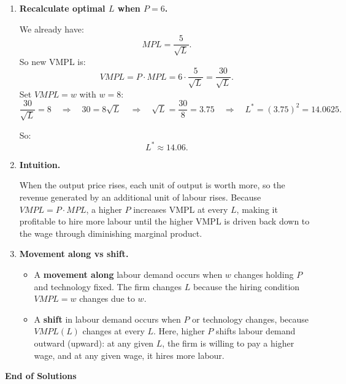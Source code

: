 \documentclass[12pt]{article}
\begin{document}
\begin{enumerate}
\item \textbf{Recalculate optimal $L$ when $P=6$.}

We already have:
\[
MPL = \frac{5}{\sqrt{L}}.
\]
So new VMPL is:
\[
VMPL = P \cdot MPL = 6 \cdot \frac{5}{\sqrt{L}} = \frac{30}{\sqrt{L}}.
\]
Set $VMPL=w$ with $w=8$:
\[
\frac{30}{\sqrt{L}} = 8
\quad \Rightarrow \quad
30 = 8\sqrt{L}
\quad \Rightarrow \quad
\sqrt{L} = \frac{30}{8} = 3.75
\quad \Rightarrow \quad
L^* = (3.75)^2 = 14.0625.
\]

So:
\[
L^* \approx 14.06.
\]

\item \textbf{Intuition.}

When the output price rises, each unit of output is worth more, so the revenue generated by an additional unit of labour rises.
Because $VMPL=P\cdot MPL$, a higher $P$ increases VMPL at every $L$, making it profitable to hire more labour until the higher VMPL is driven back down to the wage through diminishing marginal product.

\item \textbf{Movement along vs shift.}

\begin{itemize}
\item A \textbf{movement along} labour demand occurs when $w$ changes holding $P$ and technology fixed. The firm changes $L$ because the hiring condition $VMPL=w$ changes due to $w$.
\item A \textbf{shift} in labour demand occurs when $P$ or technology changes, because $VMPL(L)$ changes at every $L$. Here, higher $P$ shifts labour demand outward (upward): at any given $L$, the firm is willing to pay a higher wage, and at any given wage, it hires more labour.
\end{itemize}
\end{enumerate}

\vfill
\textbf{End of Solutions}
\end{document}
